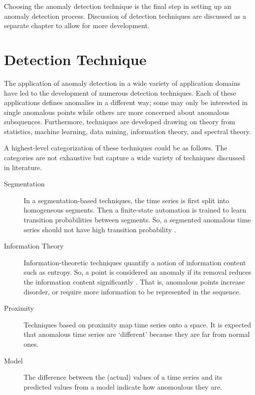 Choosing the anomaly detection technique is the final step in setting up an anomaly detection process. Discussion of detection techniques are discussed as a separate chapter to allow for more development.

\chapter[adtechnique]{Detection Technique}

The application of anomaly detection in a wide variety of application domains have led to the development of numerous detection techniques. Each of these applications defines anomalies in a different way;  some  may only be interested in single anomalous points while others are more concerned about anomalous subsquences. Furthermore, techniques are developed drawing on theory from statistics, machine learning, data mining, information theory, and spectral theory.

A highest-level categorization of these techniques could be as follows. The categories are not exhaustive but capture a wide variety of techniques discussed in literature.

\begin{description}

\item[Segmentation] In a segmentation-based techniques, the time series is first split into homogeneous segments. Then a finite-state automation is trained to learn transition probabilities between segments. So, a segmented anomalous time series should not have high transition probability \cite{Salvador2005,mahoney2005trajectory,Chan2005}.

\item[Information Theory] Information-theoretic techniques quantify a notion of information content such as entropy. So, a point is considered an anomaly if its removal reduces the information content significantly \cite{Muthukrishnan2004,jagadish1999mining}. That is, anomalous points increase disorder, or require more information to be represented in the sequence.

\item[Proximity] Techniques based on proximity map time series onto a space. It is expected that anomalous time series are `different' because they are far from normal ones.

\item[Model] The difference between the (actual) values of a time series and its predicted values from a model indicate how anomoulous they are.
 
\end{description}


